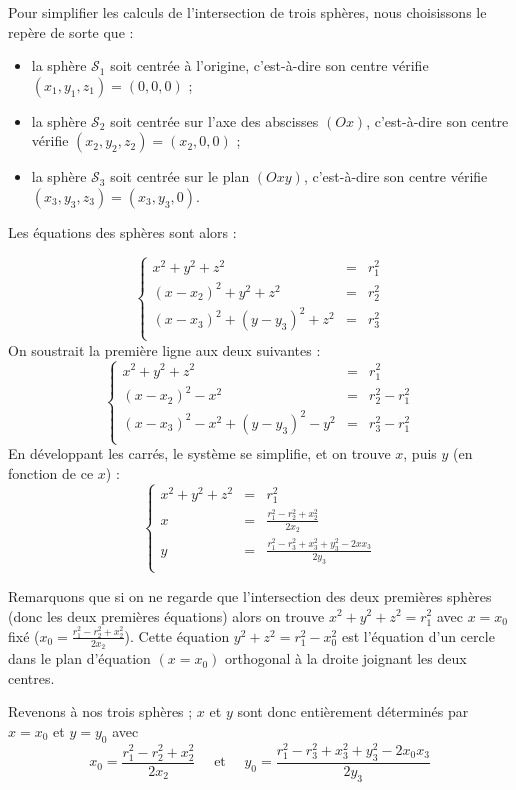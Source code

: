 \documentclass[class=report,crop=false]{standalone}
\begin{document}
Pour simplifier les calculs de l'intersection de trois sphères, nous choisissons
le repère de sorte que :
\begin{itemize}
  \item la sphère $\mathcal{S}_1$ soit centrée à l'origine, c'est-à-dire son centre
  vérifie $(x_1,y_1,z_1) = (0,0,0)$ ;
  \item la sphère $\mathcal{S}_2$ soit centrée sur l'axe des abscisses $(Ox)$, c'est-à-dire son centre
  vérifie $(x_2,y_2,z_2) = (x_2,0,0)$ ;
  \item la sphère $\mathcal{S}_3$ soit centrée sur le plan $(Oxy)$, c'est-à-dire son centre
  vérifie $(x_3,y_3,z_3) = (x_3,y_3,0)$.
\end{itemize}

Les équations des sphères sont alors :

$$\left\{\begin{array}{rcl}
x^2 + y^2 + z^2 &=& r_1^2 \\
(x-x_2)^2 + y^2 + z^2 &=& r_2^2 \\
(x-x_3)^2 + (y-y_3)^2 + z^2 &=& r_3^2 \\
\end{array}\right.$$
On soustrait la première ligne aux deux suivantes :
$$\left\{\begin{array}{rcl}
x^2 + y^2 + z^2 &=& r_1^2 \\
(x-x_2)^2 -x^2 &=& r_2^2-r_1^2 \\
(x-x_3)^2 -x^2 + (y-y_3)^2 - y^2 &=& r_3^2-r_1^2 \\
\end{array}\right.$$
En développant les carrés, le système se simplifie, et on trouve $x$, puis $y$ (en fonction de ce $x$) :
$$\left\{\begin{array}{rcl}
x^2 + y^2 + z^2 &=& r_1^2 \\
x &=& \frac{r_1^2-r_2^2+x_2^2}{2x_2}\\
y &=& \frac{r_1^2-r_3^2+x_3^2+y_3^2-2xx_3}{2y_3}\\
\end{array}\right.$$

Remarquons que si on ne regarde que l'intersection des deux premières 
sphères (donc les deux premières équations) 
alors on trouve $x^2 + y^2 + z^2 = r_1^2$
avec $x=x_0$ fixé ($x_0= \frac{r_1^2-r_2^2+x_2^2}{2x_2}$).
Cette équation $y^2 + z^2 = r_1^2 - x_0^2$ est l'équation d'un cercle
dans le plan d'équation $(x=x_0)$ orthogonal à la droite 
joignant les deux centres.


Revenons à nos trois sphères ;
$x$ et $y$ sont donc entièrement déterminés par $x=x_0$ et $y=y_0$ avec
$$x_0 = \frac{r_1^2-r_2^2+x_2^2}{2x_2}
\quad \text{ et } \quad
y_0 = \frac{r_1^2-r_3^2+x_3^2+y_3^2-2x_0x_3}{2y_3}$$
\end{document}
